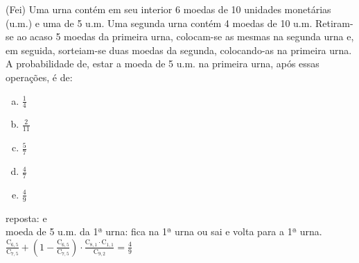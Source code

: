 \begin{ex}
 	(Fei) Uma urna contém em seu interior 6 moedas de 10 unidades monetárias (u.m.) e uma de 5 u.m. Uma segunda urna contém 4 moedas de 10 u.m. Retiram-se ao acaso 5 moedas da primeira urna, colocam-se as mesmas na segunda urna e, em seguida, sorteiam-se duas moedas da segunda, colocando-as na primeira urna. A probabilidade de, estar a moeda de 5 u.m. na primeira urna, após essas operações, é de:
    \begin{enumerate}[(a)]
    \item $\frac{1}{4}$
    \item $\frac{2}{11}$
    \item $\frac{5}{7}$
    \item $\frac{4}{7}$
    \item $\frac{4}{9}$
    \end{enumerate}
      \begin{sol}
      reposta: e \\
      moeda de 5 u.m. da 1ª urna: fica na 1ª urna ou sai e volta para a 1ª urna. \\
      $\frac{\mathrm{C}_{6,5}}{\mathrm{C}_{7,5}}+(1-\frac{\mathrm{C}_{6,5}}{\mathrm{C}_{7,5}})\cdot\frac{\mathrm{C}_{8,1}\cdot\mathrm{C}_{1,1}}{\mathrm{C}_{9,2}}=\frac{4}{9}$
      \end{sol}
\end{ex}